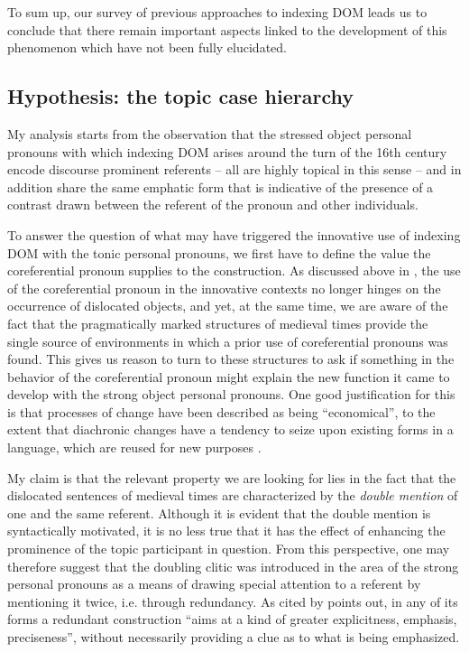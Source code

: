 \documentclass[output=paper]{LSP/langsci}
\begin{document}
 To sum up, our survey of previous approaches to  indexing DOM leads us to conclude that there remain important aspects linked to the development of this phenomenon which have not been fully elucidated.

\subsection{Hypothesis: the topic case hierarchy}\label{04-me-sec:4.3}

My analysis starts from the observation that the stressed object personal pronouns with which  indexing DOM arises around the turn of the 16th century encode discourse prominent referents – all are highly topical in this sense – and in addition share the same emphatic form that is indicative of the presence of a contrast drawn between the referent of the pronoun and other individuals.

 To answer the question of what may have triggered the innovative use of indexing DOM with the tonic personal pronouns, we first have to define the value the coreferential pronoun supplies to the construction. As discussed above in , the use of the coreferential pronoun in the innovative contexts no longer hinges on the occurrence of dislocated objects, and yet, at the same time, we are aware of the fact that the pragmatically marked structures of medieval times provide the single source of environments in which a prior use of coreferential pronouns was found. This gives us reason to turn to these structures to ask if something in the behavior of the coreferential pronoun might explain the new function it came to develop with the strong object personal pronouns. One good justification for this is that processes of change have been described as being “economical”, to the extent that diachronic changes have a tendency to seize upon existing forms in a language, which are reused for new purposes \citep[73]{Hopperetal2003Grammaticalization}.

 My claim is that the relevant property we are looking for lies in the fact that the dislocated sentences of medieval times are characterized by the \textit{double mention} of one and the same referent. Although it is evident that the double mention is syntactically motivated, it is no less true that it has the effect of enhancing the prominence of the topic participant in question. From this perspective, one may therefore suggest that the doubling clitic was introduced in the area of the strong personal pronouns as a means of drawing special attention to a referent by mentioning it twice, i.e. through redundancy. As \citet[41]{Pulgram1983Reduction} %
cited by \citet[281]{Rini1991Redundant} points out, in any of its forms a redundant construction “aims at a kind of greater explicitness, emphasis, preciseness”, without necessarily providing a clue as to what is being emphasized. 
\end{document}
